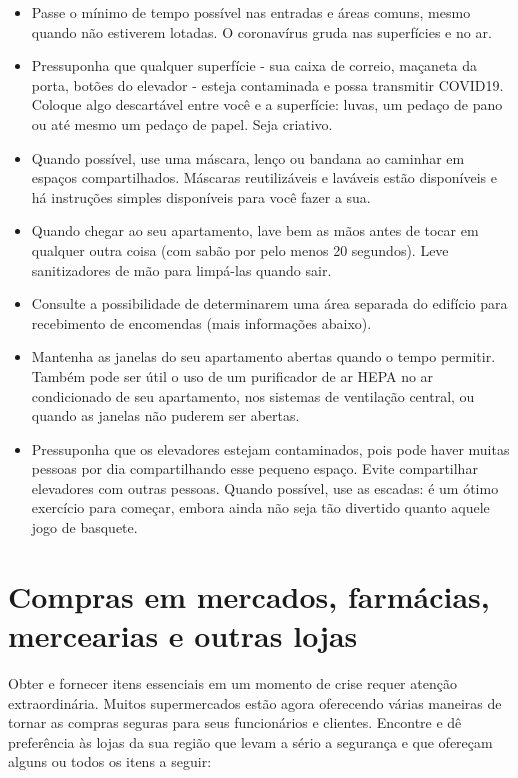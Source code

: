 \documentclass[onecolumn,journal]{IEEEtran}
\begin{document}
\begin{multicols}{2}
\begin{itemize}
\item Passe o mínimo de tempo possível nas entradas e áreas comuns, mesmo quando não estiverem lotadas. O coronavírus gruda nas superfícies e no ar.
\item Pressuponha que qualquer superfície - sua caixa de correio, maçaneta da porta, botões do elevador - esteja contaminada e possa transmitir COVID19. Coloque algo descartável entre você e a superfície: luvas, um pedaço de pano ou até mesmo um pedaço de papel. Seja criativo.
\item Quando possível, use uma máscara, lenço ou bandana ao caminhar em espaços compartilhados. Máscaras reutilizáveis e laváveis estão disponíveis e há instruções simples disponíveis para você fazer a sua.
\item Quando chegar ao seu apartamento, lave bem as mãos antes de tocar em qualquer outra coisa (com sabão por pelo menos 20 segundos). Leve sanitizadores de mão para limpá-las quando sair.
\item Consulte a possibilidade de determinarem uma área separada do edifício para recebimento de encomendas (mais informações abaixo).
\item Mantenha as janelas do seu apartamento abertas quando o tempo permitir. Também pode ser útil o uso de um purificador de ar HEPA no ar condicionado de seu apartamento, nos sistemas de ventilação central, ou quando as janelas não puderem ser abertas.
\item Pressuponha que os elevadores estejam contaminados, pois pode haver muitas pessoas por dia compartilhando esse pequeno espaço. Evite compartilhar elevadores com outras pessoas. Quando possível, use as escadas: é um ótimo exercício para começar, embora ainda não seja tão divertido quanto aquele jogo de basquete.
\end{itemize}

\section*{Compras em mercados, farmácias, mercearias e outras lojas}

Obter e fornecer itens essenciais em um momento de crise requer atenção extraordinária. Muitos supermercados estão agora oferecendo várias maneiras de tornar as compras seguras para seus funcionários e clientes. Encontre e dê preferência às lojas da sua região que levam a sério a segurança e que ofereçam alguns ou todos os itens a seguir:


\end{multicols}
\end{document}
